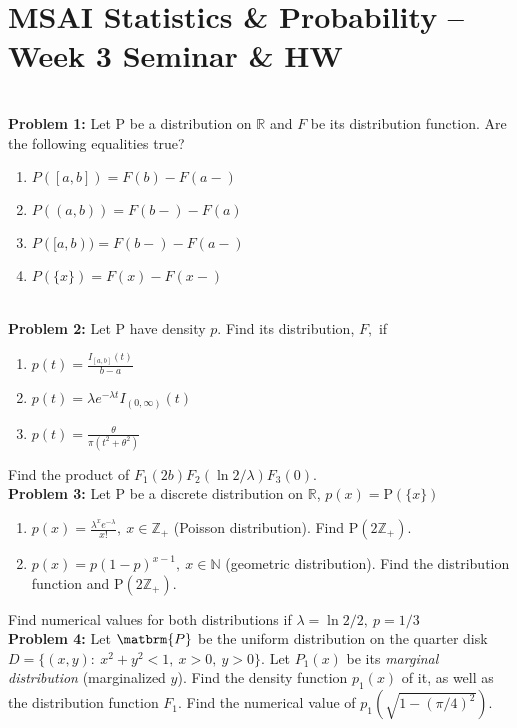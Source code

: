 \documentclass[12pt]{article}
\numberwithin{equation}{section}
\begin{document}
\section*{MSAI Statistics \& Probability – Week 3 Seminar \& HW}\\

\textbf{Problem 1:} Let $\mathrm{P}$ be a distribution on $\mathbb{R}$ and $F$ be its distribution function. Are the following equalities true?
\begin{enumerate}
    \item $P([a,b])=F(b)-F(a-)$
    \item $P((a,b))=F(b-)-F(a)$
    \item $P([a,b))=F(b-)-F(a-)$
    \item $P(\{x\})=F(x)-F(x-)$
\end{enumerate}
\\

\textbf{Problem 2:} Let $\mathrm{P}$ have density $p$. Find its distribution, $F,$ if
\begin{enumerate}
    \item $p(t)=\frac{I_{[a,b]}(t)}{b-a}$
    \item $p(t)=\lambda e^{-\lambda t} I_{(0,\infty)}(t)$
    \item $p(t)=\frac{\theta}{\pi(t^2+\theta^2)}$
\end{enumerate}
Find the product of $F_1(2b)F_2(\ln 2/\lambda)F_3(0)$.
\\

\textbf{Problem 3:} Let $\mathrm{P}$ be a discrete distribution on $\mathbb{R}$, $p(x)=\mathrm{P}(\{x\})$
\begin{enumerate}
    \item $p(x)=\frac{\lambda^x e^{-\lambda}}{x!},~x\in\mathbb{Z}_+$ (Poisson distribution). Find $\mathrm{P}(2\mathbb{Z}_+).$
    \item $p(x)=p(1-p)^{x-1},~x\in\mathbb{N}$ (geometric distribution). Find the distribution function and $\mathrm{P}(2\mathbb{Z}_+).$
\end{enumerate}
Find numerical values for both distributions if $\lambda=\ln 2/2, ~p=1/3$
\\

\textbf{Problem 4:} Let $\matbrm{P}$ be the uniform distribution on the quarter disk $D=\{(x,y):~x^2+y^2<1,~x>0,~y>0\}.$ Let $P_1(x)$ be its \textit{marginal distribution} (marginalized $y$). Find the density function $p_1(x)$ of it, as well as the distribution function $F_1$. Find the numerical value of $p_1(\sqrt{1-(\pi/4)^2}).$
\end{document}
